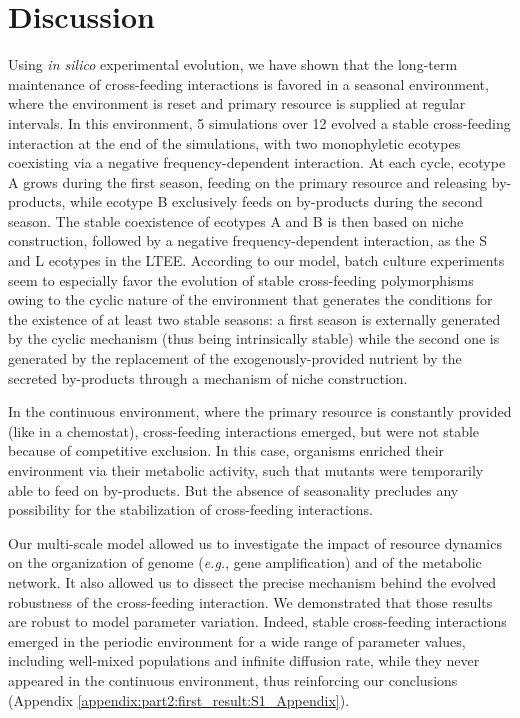 
\section{Discussion}

Using \textit{in silico} experimental evolution, we have shown that the long-term maintenance of cross-feeding interactions is favored in a seasonal environment, where the environment is reset and primary resource is supplied at regular intervals. In this environment, 5 simulations over 12 evolved a stable cross-feeding interaction at the end of the simulations, with two monophyletic ecotypes coexisting via a negative frequency-dependent interaction. At each cycle, ecotype A grows during the first season, feeding on the primary resource and releasing by-products, while ecotype B exclusively feeds on by-products during the second season. The stable coexistence of ecotypes A and B is then based on niche construction, followed by a negative frequency-dependent interaction, as the S and L ecotypes in the LTEE. According to our model, batch culture experiments seem to especially favor the evolution of stable cross-feeding polymorphisms owing to the cyclic nature of the environment that generates the conditions for the existence of at least two stable seasons: a first season is externally generated by the cyclic mechanism (thus being intrinsically stable) while the second one is generated by the replacement of the exogenously-provided nutrient by the secreted by-products through a mechanism of niche construction.

In the continuous environment, where the primary resource is constantly provided (like in a chemostat), cross-feeding interactions emerged, but were not stable because of competitive exclusion. In this case, organisms enriched their environment via their metabolic activity, such that mutants were temporarily able to feed on by-products. But the absence of seasonality precludes any possibility for the stabilization of cross-feeding interactions.

Our multi-scale model allowed us to investigate the impact of resource dynamics on the organization of genome (\textit{e.g.}, gene amplification) and of the metabolic network. It also allowed us to dissect the precise mechanism behind the evolved robustness of the cross-feeding interaction.
We demonstrated that those results are robust to model parameter variation. Indeed, stable cross-feeding interactions emerged in the periodic environment for a wide range of parameter values, including well-mixed populations and infinite diffusion rate, while they never appeared in the continuous environment, thus reinforcing our conclusions (Appendix \ref{appendix:part2:first_result:S1_Appendix}).

